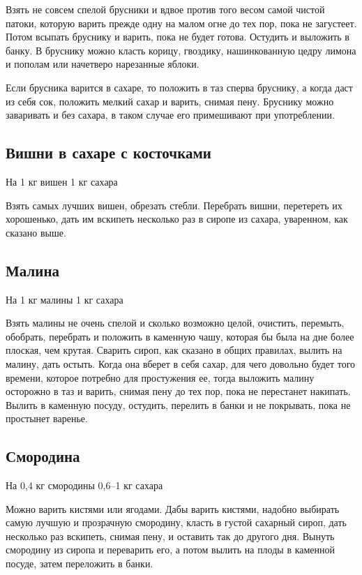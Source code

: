 Взять не совсем спелой брусники и вдвое против того весом самой чистой патоки, которую варить прежде одну на малом огне до тех пор, пока не загустеет. Потом всыпать бруснику и варить, пока не будет готова. Остудить и выложить в банку. В бруснику можно класть корицу, гвоздику, нашинкованную цедру лимона и пополам или начетверо нарезанные яблоки.

Если брусника варится в сахаре, то положить в таз сперва бруснику, а когда даст из себя сок, положить мелкий сахар и варить, снимая пену. Бруснику можно заваривать и без сахара, в таком случае его примешивают при употреблении.

\subsection{Вишни в сахаре с косточками}

На 1 кг вишен 1 кг сахара

Взять самых лучших вишен, обрезать стебли. Перебрать вишни, перетереть их хорошенько, дать им вскипеть несколько раз в сиропе из сахара, уваренном, как сказано выше.

\subsection{Малина}

На 1 кг малины 1 кг сахара

Взять малины не очень спелой и сколько возможно целой, очистить, перемыть, обобрать, перебрать и положить в каменную чашу, которая бы была на дне более плоская, чем крутая. Сварить сироп, как сказано в общих правилах, вылить на малину, дать остыть. Когда она вберет в себя сахар, для чего довольно будет того времени, которое потребно для простужения ее, тогда выложить малину осторожно в таз и варить, снимая пену до тех пор, пока не перестанет накипать. Вылить в каменную посуду, остудить, перелить в банки и не покрывать, пока не простынет варенье.

\subsection{Смородина}

На 0,4 кг смородины 0,6–1 кг сахара

Можно варить кистями или ягодами. Дабы варить кистями, надобно выбирать самую лучшую и прозрачную смородину, класть в густой сахарный сироп, дать несколько раз вскипеть, снимая пену, и оставить так до другого дня. Вынуть смородину из сиропа и переварить его, а потом вылить на плоды в каменной посуде, затем переложить в банки.

